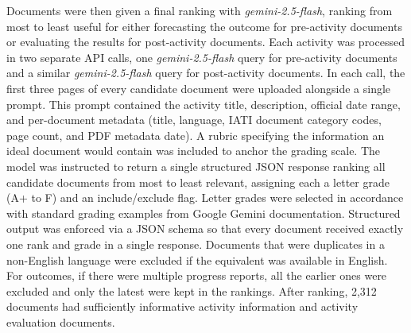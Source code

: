 Documents were then given a final ranking with \emph{gemini-2.5-flash}, ranking from most to least useful for either forecasting the outcome for pre-activity documents or evaluating the results for post-activity documents. Each activity was processed in two separate API calls, one \emph{gemini-2.5-flash} query for pre-activity documents and a similar \emph{gemini-2.5-flash} query for post-activity documents. In each call, the first three pages of every candidate document were uploaded alongside a single prompt. This prompt contained the activity title, description, official date range, and per-document metadata (title, language, IATI document category codes, page count, and PDF metadata date). A rubric specifying the information an ideal document would contain was included to anchor the grading scale. The model was instructed to return a single structured JSON response ranking all candidate documents from most to least relevant, assigning each a letter grade (A+ to F) and an include/exclude flag. Letter grades were selected in accordance with standard grading examples from Google Gemini documentation. Structured output was enforced via a JSON schema so that every document received exactly one rank and grade in a single response. Documents that were duplicates in a non-English language were excluded if the equivalent was available in English. For outcomes, if there were multiple progress reports, all the earlier ones were excluded and only the latest were kept in the rankings. After ranking, 2,312 documents had sufficiently informative activity information and activity evaluation documents.


